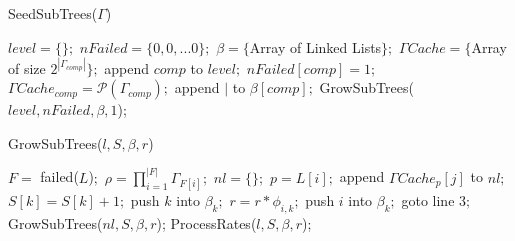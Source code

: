 \documentclass[a4paper,12pt]{article}
\author{Mihir Sanghavi}
\date{November 2012}
\begin{document}
\begin{algorithm}
\caption{SeedSubTrees($\Gamma$)}
\label{alg:seedsubtrees}
\begin{algorithmic}[1]
   \STATE $level = \{\};$ 
   \STATE $nFailed = \{0,0,...0\};$ 
   \STATE $\beta = \{$Array of Linked Lists$\};$ 
   \STATE $\Gamma Cache = \{$Array of size $2 ^{|\Gamma_{comp}|}\};$  
   	\STATE append $comp$ to $level;$
    \STATE $nFailed[comp] = 1;$
    \STATE $\Gamma Cache_{comp} = \mathcal{P}(\Gamma_{comp});$ 
    \STATE append $|$ to $\beta[comp];$
    \STATE GrowSubTrees($level, nFailed, \beta, 1$);
   \ENDIF
\ENDFOR
\end{algorithmic}
\end{algorithm}

\begin{algorithm}
\caption{GrowSubTrees($l,S,\beta,r$)}
\label{alg:growsubtrees}
\begin{algorithmic}[1]
\STATE $F = $ failed($L$)$;$
\STATE $\rho = \prod\limits_{i=1}^{|F|}\Gamma_{F[i]};$ 
  \STATE $nl = \{\};$ 
    \STATE $p = L[i];$  
    \STATE append $\Gamma Cache_p[j]$ to $nl;$
        \STATE $S[k] = S[k] + 1;$
        \STATE push $k$ into $\beta _k;$ 
        \STATE $r = r * \phi_{i,k};$ 
      \ELSE
        \STATE push $i$ into $\beta _k;$ 
      \ENDIF
    \ENDFOR
  \ENDFOR
      \STATE goto line 3$;$ 
    \ENDIF
  \ENDFOR
  \STATE GrowSubTrees($nl,S,\beta,r$); 
  \ELSE
  \STATE ProcessRates($l,S,\beta,r$); 
  \ENDIF
\ENDFOR
\end{algorithmic}
\end{algorithm}
\end{document}
